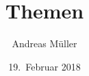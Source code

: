 %
%
%
\usepackage[utf8]{inputenc}
\usepackage[T1]{fontenc}
\usepackage{epic}
\usepackage{color}
\usepackage{array}
\usepackage{ifthen}
\usepackage{tikz}
\usetikzlibrary{shapes.geometric}
\beamertemplatenavigationsymbolsempty
\title[Themen]{Themen}
\author{Andreas Müller}
\date[]{19.~Februar 2018}

